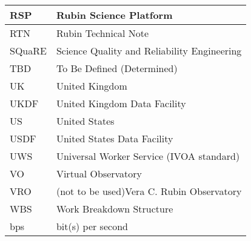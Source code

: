 \begin{longtable}{p{}p{}}
RSP & Rubin Science Platform \\\hline
RTN & Rubin Technical Note \\\hline
SQuaRE & Science Quality and Reliability Engineering \\\hline
TBD & To Be Defined (Determined) \\\hline
UK & United Kingdom \\\hline
UKDF & United Kingdom Data Facility \\\hline
US & United States \\\hline
USDF & United States Data Facility \\\hline
UWS & Universal Worker Service (IVOA standard) \\\hline
VO & Virtual Observatory \\\hline
VRO & (not to be used)Vera C. Rubin Observatory \\\hline
WBS & Work Breakdown Structure \\\hline
bps & bit(s) per second \\\hline
\end{longtable}
